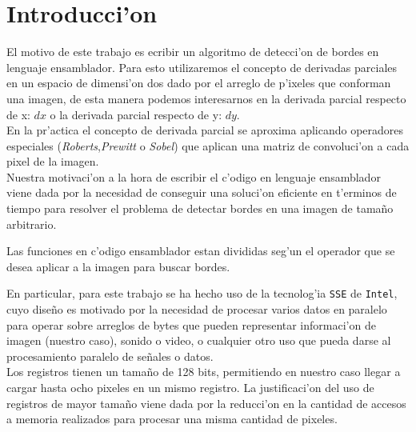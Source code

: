 \documentclass[11pt]{article}
\begin{document}
\section{Introducci'on}
El motivo de este trabajo es ecribir un algoritmo de detecci'on de bordes en lenguaje ensamblador.  Para esto utilizaremos el concepto de derivadas parciales en un espacio de dimensi'on dos dado por el arreglo de p'ixeles que conforman una imagen, de esta manera podemos interesarnos en la derivada parcial respecto de x: $dx$ o la derivada parcial respecto de y: $dy$.\\
En la pr'actica el concepto de derivada parcial se aproxima aplicando operadores especiales (\emph{Roberts},\emph{Prewitt} o \emph{Sobel}) que aplican una matriz de convoluci'on a cada pixel de la imagen.\\
Nuestra motivaci'on a la hora de escribir el c'odigo en lenguaje ensamblador viene dada por la necesidad de conseguir una soluci'on eficiente en t'erminos de tiempo para resolver el problema de detectar bordes en una imagen de tama\~{n}o arbitrario. \\
\begin{center}
\begin{minipage}{11cm}
 Las funciones en c'odigo ensamblador estan divididas seg'un el operador que se desea aplicar a la imagen para buscar bordes.
\end{minipage}
\end{center}
En particular, para este trabajo se ha hecho uso de la tecnolog'ia \verb'SSE' de \verb'Intel', cuyo diseño es motivado por la necesidad de procesar varios datos en paralelo para operar sobre arreglos de bytes que pueden representar informaci'on de imagen (nuestro caso), sonido o video, o cualquier otro uso que pueda darse al procesamiento paralelo de se\~{n}ales o datos.\\
Los registros tienen un tama\~{n}o de 128 bits, permitiendo en nuestro caso llegar a cargar hasta ocho pixeles en un mismo registro.  La justificaci'on del uso de registros de mayor tama\~{n}o viene dada por la reducci'on en la cantidad de accesos a memoria realizados para procesar una misma cantidad de pixeles.
\end{document}
